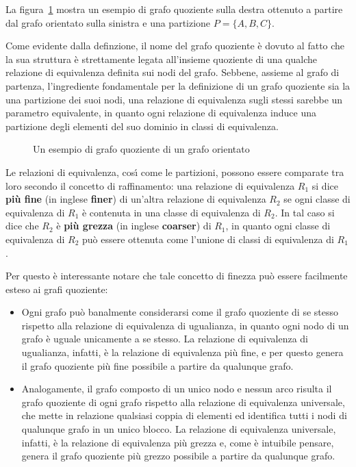 La figura~\ref{fig:quotient-graph-example} mostra un esempio di grafo quoziente sulla destra ottenuto a partire dal
grafo orientato sulla sinistra e una partizione $P = \{A, B, C\}$. \newline

Come evidente dalla definzione, il nome del grafo quoziente \`e dovuto al fatto che la sua struttura \`e
strettamente legata all'insieme quoziente di una qualche relazione di equivalenza definita sui nodi del grafo.
Sebbene, assieme al grafo di partenza, l'ingrediente fondamentale per la definizione di un grafo quoziente sia la
una partizione dei suoi nodi, una relazione di equivalenza sugli stessi sarebbe un parametro equivalente, in quanto
ogni relazione di equivalenza induce una partizione degli elementi del suo dominio in classi di equivalenza. \newline

\begin{figure}[h]
    \centering
    
    \caption{Un esempio di grafo quoziente di un grafo orientato}
    \label{fig:quotient-graph-example}
\end{figure}

Le relazioni di equivalenza, cos\'{\i} come le partizioni, possono essere comparate tra
loro secondo il concetto di raffinamento: una relazione di equivalenza $R_1$ si dice \textbf{pi\`u fine}
(in inglese \textbf{finer}) di un'altra relazione di equivalenza $R_2$ se ogni classe di equivalenza di $R_1$ \`e
contenuta in una classe di equivalenza di $R_2$.
In tal caso si dice che $R_2$ \`e \textbf{pi\`u grezza} (in inglese \textbf{coarser}) di $R_1$, in quanto ogni classe
di equivalenza di $R_2$ pu\`o essere ottenuta come l'unione di classi di equivalenza di $R_1$. \newline

Per questo \`e interessante notare che tale concetto di finezza pu\`o essere facilmente esteso ai grafi quoziente:
\begin{itemize}
    \item Ogni grafo pu\`o banalmente considerarsi come il grafo quoziente di se stesso rispetto
    alla relazione di equivalenza di ugualianza, in quanto ogni nodo di un grafo \`e uguale unicamente a se stesso.
    La relazione di equivalenza di ugualianza, infatti, \`e la relazione di equivalenza pi\`u fine, e per questo
    genera il grafo quoziente pi\`u fine possibile a partire da qualunque grafo.
    \item Analogamente, il grafo composto di un unico nodo e nessun arco risulta il grafo quoziente di ogni grafo
    rispetto alla relazione di equivalenza universale, che mette in relazione qualsiasi coppia di elementi ed
    identifica tutti i nodi di qualunque grafo in un unico blocco.
    La relazione di equivalenza universale, infatti, \`e la relazione di equivalenza pi\`u grezza e, come \`e
    intuibile pensare, genera il grafo quoziente pi\`u grezzo possibile a partire da qualunque grafo.
\end{itemize}


